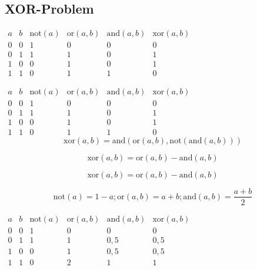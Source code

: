 \documentclass{beamer}
\begin{document}
\subsection{XOR-Problem}
\begin{frame}{\insertsection}{\insertsubsection}
$\begin{array}{cccccc}
a	& b  & \mathrm{not}(a) & \mathrm{or}(a,b) & \mathrm{and}(a,b)  & \mathrm{xor}(a,b) \\ 
0	& 0  & 1      & 0 & 0 & 0 \\ 
0	& 1  & 1      & 1 & 0 & 1 \\ 
1	& 0  & 0      & 1 & 0 & 1 \\ 
1	& 1  & 0      & 1 & 1 & 0
\end{array} $
\end{frame}

\begin{frame}{\insertsection}{\insertsubsection}
	$\begin{array}{cccccc}
	a	& b  & \mathrm{not}(a) & \mathrm{or}(a,b) & \mathrm{and}(a,b)  & \mathrm{xor}(a,b) \\ 
	0	& 0  & 1      & 0 & 0 & 0 \\ 
	0	& 1  & 1      & 1 & 0 & 1 \\ 
	1	& 0  & 0      & 1 & 0 & 1 \\ 
	1	& 1  & 0      & 1 & 1 & 0
	\end{array} $
	$$\mathrm{xor}(a,b) = \mathrm{and}(\mathrm{or}(a,b), \mathrm{not}(\mathrm{and}(a,b))) $$
	
	$$\mathrm{xor}(a,b) = \mathrm{or}(a,b) - \mathrm{and}(a,b) $$
\end{frame}

\begin{frame}{\insertsection}{\insertsubsection}
	$$\mathrm{xor}(a,b) = \mathrm{or}(a,b) - \mathrm{and}(a,b) $$

$$\mathrm{not}(a) = 1-a ; \mathrm{or}(a,b) = a+b ; \mathrm{and}(a,b) = \frac{a+b}{2}$$
\bigskip

	$\begin{array}{cccccc}
	a	& b  & \mathrm{not}(a) & \mathrm{or}(a,b) & \mathrm{and}(a,b)  & \mathrm{xor}(a,b) \\ 
	0	& 0  & 1      & 0 & 0 & 0 \\ 
	0	& 1  & 1      & 1 & 0,5 & 0,5 \\ 
	1	& 0  & 0      & 1 & 0,5 & 0,5 \\ 
	1	& 1  & 0      & 2 & 1 & 1
	\end{array} $


\end{frame}
\end{document}
